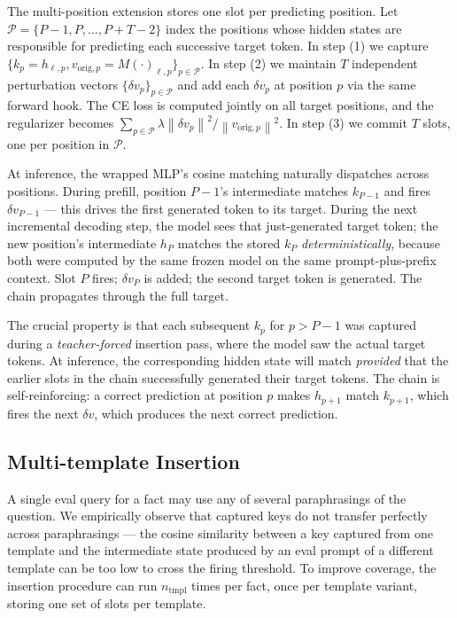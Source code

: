 \documentclass[11pt,a4paper]{article}
\newcommand{\norm}[1]{\left\|#1\right\|}
\begin{document}
The multi-position extension stores one slot per predicting position.
Let $\mathcal{P} = \{P-1, P, \ldots, P+T-2\}$ index the positions whose
hidden states are responsible for predicting each successive target
token. In step (1) we capture
$\{k_p = h_{\ell, p}, v_{\text{orig}, p} = M(\cdot)_{\ell, p}\}_{p \in \mathcal{P}}$.
In step (2) we maintain $T$ independent perturbation vectors
$\{\delta v_p\}_{p \in \mathcal{P}}$ and add each $\delta v_p$ at position
$p$ via the same forward hook. The CE loss is computed jointly on all
target positions, and the regularizer becomes
$\sum_{p \in \mathcal{P}} \lambda \norm{\delta v_p}^2 / \norm{v_{\text{orig}, p}}^2$.
In step (3) we commit $T$ slots, one per position in $\mathcal{P}$.

At inference, the wrapped MLP's cosine matching naturally dispatches
across positions. During prefill, position $P-1$'s intermediate matches
$k_{P-1}$ and fires $\delta v_{P-1}$ --- this drives the first generated
token to its target. During the next incremental decoding step, the
model sees that just-generated target token; the new position's
intermediate $h_P$ matches the stored $k_P$ \emph{deterministically},
because both were computed by the same frozen model on the same
prompt-plus-prefix context. Slot $P$ fires; $\delta v_P$ is added; the
second target token is generated. The chain propagates through the
full target.

The crucial property is that each subsequent $k_p$ for $p > P-1$ was
captured during a \emph{teacher-forced} insertion pass, where the
model saw the actual target tokens. At inference, the corresponding
hidden state will match \emph{provided} that the earlier slots in the
chain successfully generated their target tokens. The chain is
self-reinforcing: a correct prediction at position $p$ makes $h_{p+1}$
match $k_{p+1}$, which fires the next $\delta v$, which produces the
next correct prediction.

\subsection{Multi-template Insertion}

A single eval query for a fact may use any of several paraphrasings of
the question. We empirically observe that captured keys do not transfer
perfectly across paraphrasings --- the cosine similarity between a key
captured from one template and the intermediate state produced by an
eval prompt of a different template can be too low to cross the firing
threshold. To improve coverage, the insertion procedure can run $n_\text{tmpl}$
times per fact, once per template variant, storing one set of slots per
template.
\end{document}
